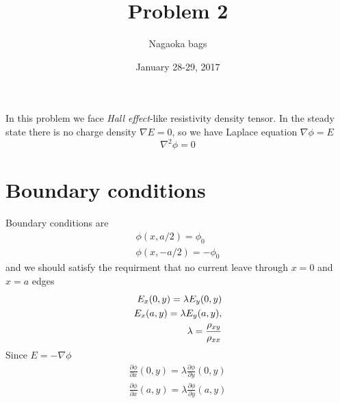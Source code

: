 \documentclass[a4paper]{article}
\title{Problem 2}
\author{Nagaoka bags}
\date{January 28-29, 2017}
\newcommand{\pd}{\partial}
\begin{document}
\maketitle
In this problem we face \textit{Hall effect}-like resistivity density tensor. 
In the steady state there is no charge density $\nabla E = 0$, so we have Laplace equation $\nabla \phi = E$
\begin{equation}
\nabla ^2 \phi = 0
\end{equation}
\section{Boundary conditions}
Boundary conditions are 
\begin{equation}
\begin{split}
\phi(x,a/2) = \phi_0 \\
\phi(x,-a/2) = -\phi_0
\end{split}
\end{equation}
and we should satisfy the requirment that no current leave through $x = 0$ and $x = a$ edges
\begin{equation}
\begin{split}
E_x(0,y) = \lambda E_y(0,y) \\
E_x(a,y) = \lambda E_y(a,y), \\
\lambda = {\rho_{xy} \over \rho_{xx}}  
\end{split}
\end{equation} 
Since $E = - \nabla \phi$
\begin{equation}
\begin{split}
\frac{\pd \phi}{\pd x} (0,y) = \lambda \frac{\pd \phi}{\pd y} (0,y) \\
\frac{\pd \phi}{\pd x} (a,y) = \lambda \frac{\pd \phi}{\pd y} (a,y)
\end{split}
\end{equation} 
\end{document}
